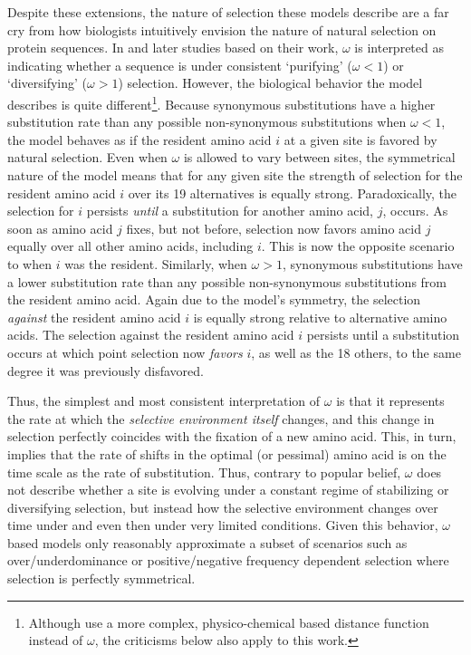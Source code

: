 \documentclass[12pt,letterpaper]{article}
\newcommand{\PC}{physico-chemical\xspace}
\begin{document}
Despite these extensions, the nature of selection these models describe are a far cry from how biologists intuitively envision the nature of natural selection on protein sequences.
In \citet{GoldmanAndYang1994,YangAndNielsen1998,NielsenAndYang1998} and later studies based on their work, $\omega$ is interpreted as indicating whether a sequence is under consistent `purifying' ($\omega < 1$) or `diversifying' ($\omega > 1$) selection.
However, the biological behavior the model describes is quite different\footnote{Although \citet{GoldmanAndYang1994} use a more complex, \PC based distance function instead of $\omega$, the criticisms below also apply to this work.}.
Because synonymous substitutions have a higher substitution rate than any possible non-synonymous substitutions when $\omega < 1$, the model behaves as if the resident amino acid $i$ at a given site is favored by natural selection.
Even when $\omega$ is allowed to vary between sites, the symmetrical nature of the model means that for any given site the strength of selection for the resident amino acid $i$ over its 19 alternatives is equally strong.
Paradoxically, the selection for $i$ persists \emph{until} a substitution for another amino acid, $j$, occurs.
As soon as amino acid $j$ fixes, but not before, selection now favors amino acid $j$ equally over all other amino acids, including $i$.
This is now the opposite scenario to when $i$ was the resident.
Similarly, when $\omega > 1$, synonymous substitutions have a lower substitution rate than any possible non-synonymous substitutions from the resident amino acid.
Again due to the model's symmetry, the selection \emph{against} the resident amino acid $i$ is equally strong relative to alternative amino acids.
The selection against the resident amino acid $i$ persists until a substitution occurs at which point selection now \emph{favors} $i$, as well as the 18 others, to the same degree it was previously disfavored.

Thus, the simplest and most consistent interpretation of $\omega$ is that it represents the rate at which the \emph{selective environment itself} changes, and this change in selection perfectly coincides with the fixation of a new amino acid.
This, in turn, implies that the rate of shifts in the optimal (or pessimal) amino acid is on the time scale as the rate of substitution.
Thus, contrary to popular belief,  $\omega$ does not describe whether a site is evolving under a constant regime of stabilizing or diversifying selection, but instead how the selective environment changes over time under and even then under very limited conditions.
Given this behavior, $\omega$ based models only reasonably approximate a subset of scenarios such as over/underdominance or positive/negative frequency dependent selection \citep{HughesAndNei1988,Nowak2006} where selection is perfectly symmetrical.
\end{document}
